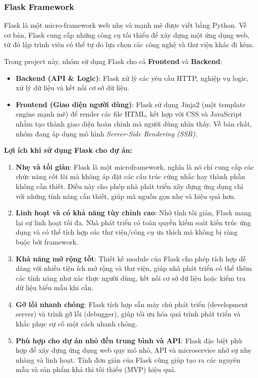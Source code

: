 \subsubsection{Flask Framework}

Flask là một micro-framework web nhẹ và mạnh mẽ được viết bằng Python. Về cơ bản, Flask cung cấp những công cụ tối thiểu để xây dựng một ứng dụng web, từ đó lập trình viên có thể tự do lựa chọn các công nghệ và thư viện khác đi kèm. 

Trong project này, nhóm sử dụng Flask cho cả \textbf{Frontend} và \textbf{Backend}:

\begin{itemize}
    \item \textbf{Backend (API \& Logic)}: Flask xử lý các yêu cầu HTTP, nghiệp vụ logic, xử lý dữ liệu và kết nối cơ sở dữ liệu.
    \item \textbf{Frontend (Giao diện người dùng)}: Flask sử dụng Jinja2 (một template engine mạnh mẽ) để render các file HTML, kết hợp với CSS và JavaScript nhằm tạo thành giao diện hoàn chỉnh mà người dùng nhìn thấy. Về bản chất, nhóm đang áp dụng mô hình \textit{Server-Side Rendering (SSR)}.
\end{itemize}
\textbf{Lợi ích khi sử dụng Flask cho dự án:}

\begin{enumerate}
    \item \textbf{Nhẹ và tối giản}:  
    Flask là một microframework, nghĩa là nó chỉ cung cấp các chức năng cốt lõi mà không áp đặt các cấu trúc cứng nhắc hay thành phần không cần thiết. Điều này cho phép nhà phát triển xây dựng ứng dụng chỉ với những tính năng cần thiết, giúp mã nguồn gọn nhẹ và hiệu quả hơn.
    
    \item \textbf{Linh hoạt và có khả năng tùy chỉnh cao}:  
    Nhờ tính tối giản, Flask mang lại sự linh hoạt tối đa. Nhà phát triển có toàn quyền kiểm soát kiến trúc ứng dụng và có thể tích hợp các thư viện/công cụ ưa thích mà không bị ràng buộc bởi framework.
    
    \item \textbf{Khả năng mở rộng tốt}:  
    Thiết kế module của Flask cho phép tích hợp dễ dàng với nhiều tiện ích mở rộng và thư viện, giúp nhà phát triển có thể thêm các tính năng như xác thực người dùng, kết nối cơ sở dữ liệu hoặc kiểm tra dữ liệu biểu mẫu khi cần.
    
    \item \textbf{Gỡ lỗi nhanh chóng}:  
    Flask tích hợp sẵn máy chủ phát triển (development server) và trình gỡ lỗi (debugger), giúp tối ưu hóa quá trình phát triển và khắc phục sự cố một cách nhanh chóng.
    
    \item \textbf{Phù hợp cho dự án nhỏ đến trung bình và API}:  
    Flask đặc biệt phù hợp để xây dựng ứng dụng web quy mô nhỏ, API và microservice nhờ sự nhẹ nhàng và linh hoạt. Tính đơn giản của Flask cũng giúp tạo ra các nguyên mẫu và sản phẩm khả thi tối thiểu (MVP) hiệu quả.
\end{enumerate}
